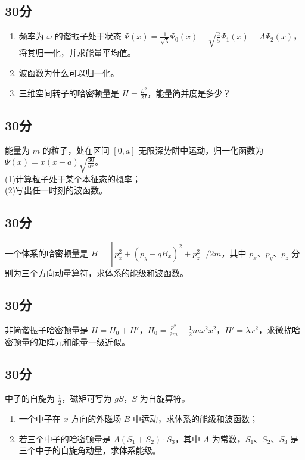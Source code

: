 
\subsection{30分}
\begin{enumerate}
\item 频率为 $\omega$ 的谐振子处于状态 $\varPsi (x)=\frac{1}{\sqrt{5}}\varPsi_{0} (x)-\sqrt{\frac{2}{5}}\varPsi_{1} (x)-A\varPsi_2 (x)$，将其归一化，并求能量平均值。
\item 波函数为什么可以归一化。
\item 三维空间转子的哈密顿量是 $H=\frac{L^{2}}{2I}$，能量简并度是多少？
\end{enumerate}
\subsection{30分}
能量为 $m$ 的粒子，处在区间 $[0,a]$ 无限深势阱中运动，归一化函数为 $\varPsi (x)=x(x-a)\sqrt{\frac{30}{a^{5}}}$。\\
(1)计算粒子处于某个本征态的概率；\\
(2)写出任一时刻的波函数。
\subsection{30分}
一个体系的哈密顿量是 $H=[p^{2}_{x}+(p_{y}-qB_{x})^{2}+p^{2}_{z}]/2m$，其中 $p_{x}$、$p_{y}$、$p_{z}$ 分别为三个方向动量算符，求体系的能级和波函数。
\subsection{30分}
非简谐振子哈密顿量是 $H=H_{0}+H'$，$H_{0}=\frac{p^{2}}{2m}+\frac{1}{2}m\omega^{2}x^{2}$，$H'=\lambda x^{2}$，求微扰哈密顿量的矩阵元和能量一级近似。
\subsection{30分}
中子的自旋为 $\frac{1}{2}$，磁矩可写为 $gS$，$S$ 为自旋算符。
\begin{enumerate}
\item 一个中子在 $x$ 方向的外磁场 $B$ 中运动，求体系的能级和波函数；
\item 若三个中子的哈密顿量是 $A(S_{1}+S_{2})\cdot S_{3}$，其中 $A$ 为常数，$S_{1}$、$S_{2}$、$S_{3}$ 是三个中子的自旋角动量，求体系能级。
\end{enumerate}